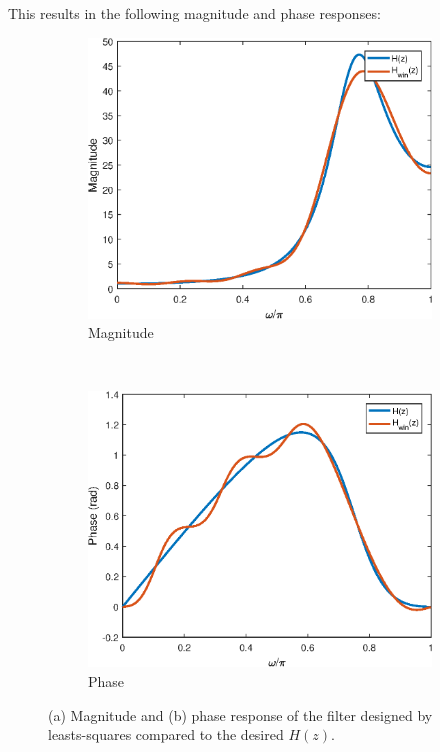 \documentclass{article}
\begin{document}
This results in the following magnitude and phase responses:
\FloatBarrier
\begin{figure}[h!]
	\centering
	\begin{subfigure}[h!]{0.5\textwidth}
		\includegraphics[width=\textwidth]{eq_ls_mag.eps}
		\caption{Magnitude}
	\end{subfigure}%
	~ %
	\begin{subfigure}[h!]{0.5\textwidth}
		\includegraphics[width=\textwidth]{eq_ls_phase.eps}
		\caption{Phase}
	\end{subfigure}
	\caption{(a) Magnitude and (b) phase response of the filter designed by leasts-squares compared to the desired $H(z)$.}
\end{figure}
\FloatBarrier
\end{document}
